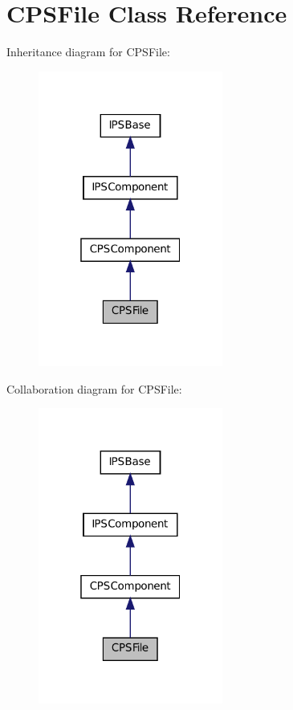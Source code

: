 \hypertarget{classCPSFile}{
\section{CPSFile Class Reference}
\label{classCPSFile}
}


Inheritance diagram for CPSFile:\nopagebreak
\begin{figure}[H]
\begin{center}
\leavevmode
\includegraphics[width=172pt]{classCPSFile__inherit__graph}
\end{center}
\end{figure}


Collaboration diagram for CPSFile:\nopagebreak
\begin{figure}[H]
\begin{center}
\leavevmode
\includegraphics[width=172pt]{classCPSFile__coll__graph}
\end{center}
\end{figure}
